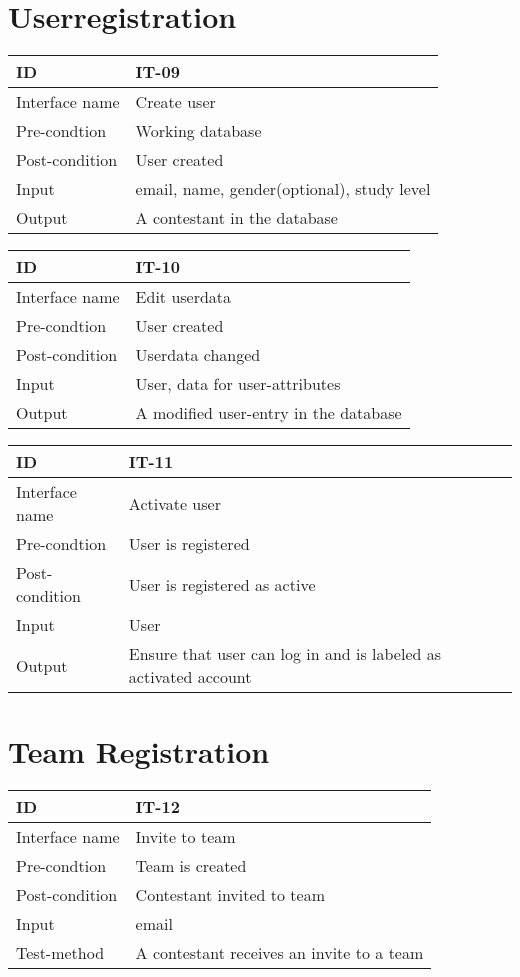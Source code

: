 \section{Userregistration}


\begin{longtable}{|l|p{}|}
\hline
ID & IT-09\\\hline
Interface name & Create user\\\hline
Pre-condtion & Working database\\\hline
Post-condition & User created\\\hline
Input & email, name, gender(optional), study level\\\hline
Output & A contestant in the database\\\hline
\end{longtable}


\begin{longtable}{|l|p{}|}
\hline
ID & IT-10\\\hline
Interface name & Edit userdata\\\hline
Pre-condtion & User created\\\hline
Post-condition & Userdata changed\\\hline
Input & User, data for user-attributes\\\hline
Output & A modified user-entry in the database\\\hline
\end{longtable}


\begin{longtable}{|l|p{}|}
\hline
ID & IT-11\\\hline
Interface name & Activate user\\\hline
Pre-condtion & User is registered\\\hline
Post-condition & User is registered as active\\\hline
Input & User\\\hline
Output & Ensure that user can log in and is labeled as activated
account\\\hline
\end{longtable}

\section{Team Registration}

\begin{longtable}{|l|p{}|}
\hline
ID & IT-12\\\hline
Interface name & Invite to team\\\hline
Pre-condtion & Team is created\\\hline
Post-condition & Contestant invited to team\\\hline
Input & email\\\hline
Test-method & A contestant receives an invite to a team\\\hline
\end{longtable}


